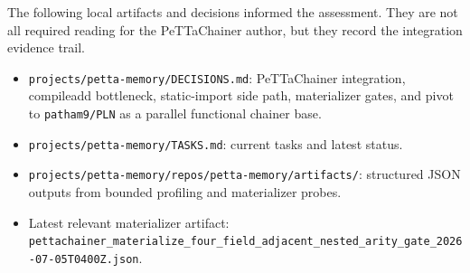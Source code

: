 \documentclass[11pt]{article}
\newcommand{\fpath}[1]{\texttt{#1}}
\begin{document}
The following local artifacts and decisions informed the assessment.  They are
not all required reading for the PeTTaChainer author, but they record the
integration evidence trail.

\begin{itemize}
  \item \fpath{projects/petta-memory/DECISIONS.md}: PeTTaChainer integration,
  compileadd bottleneck, static-import side path, materializer gates, and pivot
  to \fpath{patham9/PLN} as a parallel functional chainer base.
  \item \fpath{projects/petta-memory/TASKS.md}: current tasks and latest status.
  \item \fpath{projects/petta-memory/repos/petta-memory/artifacts/}:
  structured JSON outputs from bounded profiling and materializer probes.
  \item Latest relevant materializer artifact:
  \fpath{pettachainer\_materialize\_four\_field\_adjacent\_nested\_arity\_gate\_2026-07-05T0400Z.json}.
\end{itemize}
\end{document}
